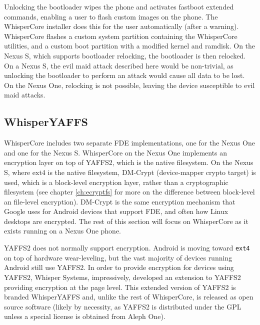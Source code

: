 Unlocking the bootloader wipes the phone and activates fastboot extended commands, enabling a user to flash custom images on the
phone.  The WhisperCore installer does this for the user automatically (after a warning).  WhisperCore flashes a custom system
partition containing the WhisperCore utilities, and a custom boot partition with a modified kernel and ramdisk.  On the Nexus S,
which supports bootloader relocking, the bootloader is then relocked.  On a Nexus S, the evil maid attack described here would be
non-trivial, as unlocking the bootloader to perform an attack would cause all data to be lost.  On the Nexus One, relocking is not
possible, leaving the device susceptible to evil maid attacks. 

\subsection{WhisperYAFFS}
WhisperCore includes two separate FDE implementations, one for the Nexus One and one for the Nexus S. WhisperCore on the Nexus
One implements an encryption layer on top of YAFFS2, which is the native filesystem.  On the Nexus S, where ext4 is the native
filesystem, DM-Crypt (device-mapper crypto target) is used, which is a block-level encryption layer, rather than a cryptographic
filesystem (see chapter \ref{ch:ecryptfs} for more on the difference between block-level an file-level encryption).  DM-Crypt is the
same encryption mechanism that Google uses for Android devices that support FDE, and often how Linux desktops are encrypted.  The
rest of this section will focus on WhisperCore as it exists running on a Nexus One phone.

YAFFS2 does not normally support encryption.  Android is moving toward \texttt{ext4} on top of hardware
wear-leveling, but the vast majority of devices running Android still use YAFFS2.  In order to provide encryption for devices using
YAFFS2, Whisper Systems, impressively, developed an extension to YAFFS2 providing encryption at the page level.  This extended
version of YAFFS2 is branded WhisperYAFFS and, unlike the rest of WhisperCore, is released as open source software (likely by
necessity, as YAFFS2 is distributed under the GPL unless a special license is obtained from Aleph One).

